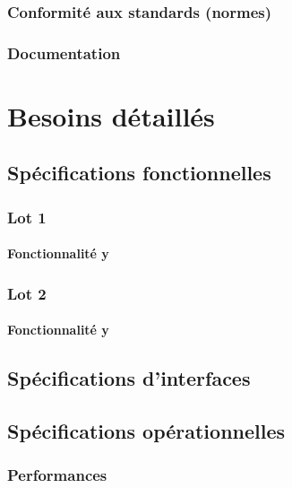 \documentclass[asi]{picINSA}
\begin{document}
\subsection{Conformité aux standards (normes)}

\subsection{Documentation}

\chapter{Besoins détaillés}

\section{Spécifications fonctionnelles}
\label{spec_fonct}


\subsection{Lot 1}

\subsubsection{Fonctionnalité y}

\subsection{Lot 2}

\subsubsection{Fonctionnalité y}

\section{Spécifications d'interfaces}

\section{Spécifications opérationnelles}

\subsection{Performances}
\end{document}
